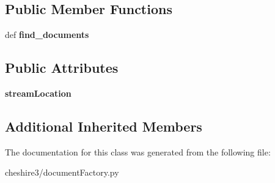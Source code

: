 \subsection*{Public Member Functions}
\begin{DoxyCompactItemize}
\item 
\hypertarget{classcheshire3_1_1document_factory_1_1_directory_document_stream_ac84af923d1e81e5f236476bd6b44d5eb}{def {\bfseries find\-\_\-documents}}\label{classcheshire3_1_1document_factory_1_1_directory_document_stream_ac84af923d1e81e5f236476bd6b44d5eb}

\end{DoxyCompactItemize}
\subsection*{Public Attributes}
\begin{DoxyCompactItemize}
\item 
\hypertarget{classcheshire3_1_1document_factory_1_1_directory_document_stream_a2bf8a330085f942b0d74d6137957f6cc}{{\bfseries stream\-Location}}\label{classcheshire3_1_1document_factory_1_1_directory_document_stream_a2bf8a330085f942b0d74d6137957f6cc}

\end{DoxyCompactItemize}
\subsection*{Additional Inherited Members}


The documentation for this class was generated from the following file\-:\begin{DoxyCompactItemize}
\item 
cheshire3/document\-Factory.\-py\end{DoxyCompactItemize}
